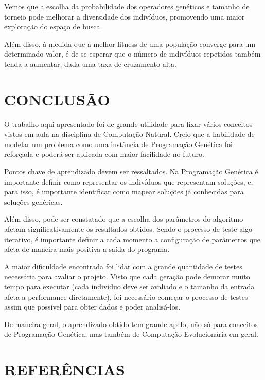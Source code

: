 \documentclass[12pt]{article}
\begin{document}
Vemos que a escolha da probabilidade dos operadores genéticos e tamanho de torneio pode melhorar
a diversidade dos indivíduos, promovendo uma maior exploração do espaço de busca.

Além disso, à medida que a melhor fitness de uma população converge para um determinado valor,
é de se esperar que o número de indivíduos repetidos também tenda a aumentar, dada uma taxa 
de cruzamento alta.

\section{CONCLUSÃO}

O trabalho aqui apresentado foi de grande utilidade para fixar vários conceitos vistos em aula
na disciplina de Computação Natural. Creio que a habilidade de modelar um problema como uma
instância de Programação Genética foi reforçada e poderá ser aplicada com maior facilidade
no futuro.

Pontos chave de aprendizado devem ser ressaltados. Na Programação Genética é importante
definir como representar os indivíduos que representam soluções, e, para isso, é importante
identificar como mapear soluções já conhecidas para soluções genéricas.

Além disso, pode ser constatado que a escolha dos parâmetros do algoritmo afetam significativamente
os resultados obtidos. Sendo o processo de teste algo iterativo, é importante definir a cada
momento a configuração de parâmetros que afeta de maneira mais positiva a saída do programa.

A maior dificuldade encontrada foi lidar com a grande quantidade de testes necessária para
avaliar o projeto. Visto que cada geração pode demorar muito tempo para executar (cada indivíduo
deve ser avaliado e o tamanho da entrada afeta a performance diretamente), foi necessário começar
o processo de testes assim que possível para obter dados e poder analisá-los.

De maneira geral, o aprendizado obtido tem grande apelo, não só para conceitos de Programação Genética,
mas também de Computação Evolucionária em geral.

\section{REFERÊNCIAS}



\end{document}
